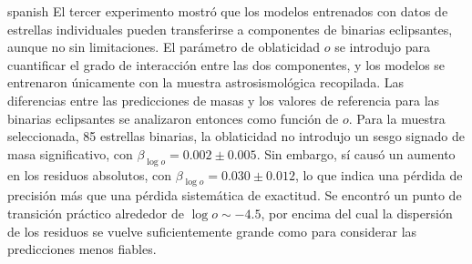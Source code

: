 \begin{otherlanguage*}{spanish}
El tercer experimento mostr\'o que los modelos entrenados con datos de estrellas individuales pueden transferirse a componentes de binarias eclipsantes, aunque no sin limitaciones. El par\'ametro de oblaticidad $o$ se introdujo para cuantificar el grado de interacci\'on entre las dos componentes, y los modelos se entrenaron \'unicamente con la muestra astrosismol\'ogica recopilada. Las diferencias entre las predicciones de masas y los valores de referencia para las binarias eclipsantes se analizaron entonces como funci\'on de $o$. Para la muestra seleccionada, 85 estrellas binarias, la oblaticidad no introdujo un sesgo signado de masa significativo, con $\beta_{\log o} = 0.002 \pm 0.005$. Sin embargo, s\'i caus\'o un aumento en los residuos absolutos, con $\beta_{\log o} = 0.030 \pm 0.012$, lo que indica una p\'erdida de precisi\'on m\'as que una p\'erdida sistem\'atica de exactitud. Se encontr\'o un punto de transici\'on pr\'actico alrededor de $\log o \sim -4.5$, por encima del cual la dispersi\'on de los residuos se vuelve suficientemente grande como para considerar las predicciones menos fiables.
\end{otherlanguage*}






